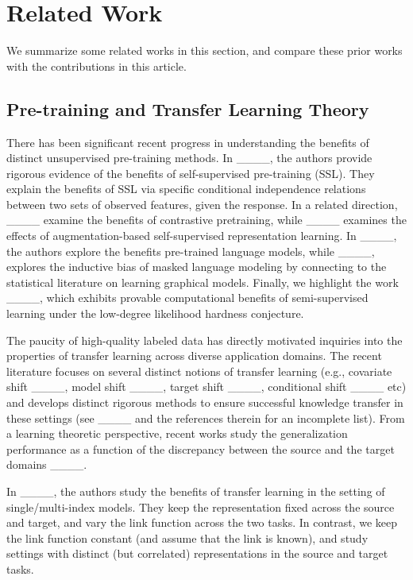 \section{Related Work}
We summarize some related works in this section, and compare these prior works with the contributions in this article.


\subsection{Pre-training and Transfer Learning Theory}
There has been significant recent progress in understanding the benefits of distinct unsupervised pre-training methods. In ____, the authors provide rigorous evidence of the benefits of self-supervised pre-training (SSL). They explain the benefits of SSL via specific conditional independence relations between two sets of observed features, given the response. In a related direction, ____ examine the benefits of contrastive pretraining, while ____ examines the effects of augmentation-based self-supervised representation learning. In ____, the authors explore the benefits pre-trained language models, while  ____, explores the inductive bias of masked language modeling by connecting to the statistical literature on learning graphical models. Finally, we highlight the work ____, which  exhibits provable computational benefits of semi-supervised learning under the low-degree likelihood hardness conjecture.


The paucity of high-quality labeled data has directly motivated inquiries into the properties of transfer learning across diverse application domains. The recent literature focuses on several distinct notions of transfer learning (e.g., covariate shift ____, model shift ____, target shift ____, conditional shift  ____ etc) and develops distinct rigorous methods to ensure successful knowledge transfer in these settings (see ____ and the references therein for an incomplete list). From a learning theoretic perspective, recent works study the generalization performance as a function of the discrepancy between the source and the target domains ____.


In ____, the authors study the benefits of transfer learning in the setting of single/multi-index models. They keep the representation fixed across the source and target, and vary the link function across the two tasks. In contrast, we keep the link function constant (and assume that the link is known), and study settings with distinct (but correlated) representations in the source and target tasks. 


